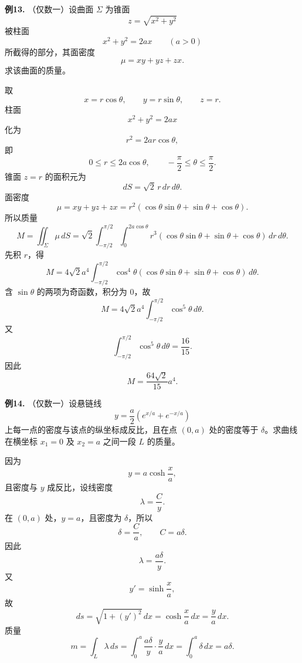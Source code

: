 \begin{problemblock}
\textbf{例13.} （仅数一）设曲面 \(\Sigma\) 为锥面
\[
z=\sqrt{x^2+y^2}
\]
被柱面
\[
x^2+y^2=2ax\qquad (a>0)
\]
所截得的部分，其面密度
\[
\mu=xy+yz+zx.
\]
求该曲面的质量。
\end{problemblock}
\begin{solutionblock}
取
\[
x=r\cos\theta,\qquad y=r\sin\theta,\qquad z=r.
\]
柱面
\[
x^2+y^2=2ax
\]
化为
\[
r^2=2ar\cos\theta,
\]
即
\[
0\le r\le2a\cos\theta,\qquad -\frac{\pi}{2}\le\theta\le\frac{\pi}{2}.
\]
锥面 \(z=r\) 的面积元为
\[
dS=\sqrt2\,r\,dr\,d\theta.
\]
面密度
\[
\mu=xy+yz+zx
=r^2(\cos\theta\sin\theta+\sin\theta+\cos\theta).
\]
所以质量
\[
M=\iint_\Sigma \mu\,dS
=\sqrt2\int_{-\pi/2}^{\pi/2}\int_0^{2a\cos\theta}
r^3(\cos\theta\sin\theta+\sin\theta+\cos\theta)\,dr\,d\theta.
\]
先积 \(r\)，得
\[
M=4\sqrt2a^4\int_{-\pi/2}^{\pi/2}
\cos^4\theta(\cos\theta\sin\theta+\sin\theta+\cos\theta)\,d\theta.
\]
含 \(\sin\theta\) 的两项为奇函数，积分为 \(0\)，故
\[
M=4\sqrt2a^4\int_{-\pi/2}^{\pi/2}\cos^5\theta\,d\theta.
\]
又
\[
\int_{-\pi/2}^{\pi/2}\cos^5\theta\,d\theta=\frac{16}{15}.
\]
因此
\[
M=\frac{64\sqrt2}{15}a^4.
\]
\end{solutionblock}

\begin{problemblock}
\textbf{例14.} （仅数一）设悬链线
\[
y=\frac a2\left(e^{x/a}+e^{-x/a}\right)
\]
上每一点的密度与该点的纵坐标成反比，且在点 \((0,a)\) 处的密度等于 \(\delta\)。求曲线在横坐标 \(x_1=0\) 及 \(x_2=a\) 之间一段 \(L\) 的质量。
\end{problemblock}
\begin{solutionblock}
因为
\[
y=a\cosh\frac{x}{a},
\]
且密度与 \(y\) 成反比，设线密度
\[
\lambda=\frac{C}{y}.
\]
在 \((0,a)\) 处，\(y=a\)，且密度为 \(\delta\)，所以
\[
\delta=\frac Ca,
\qquad C=a\delta.
\]
因此
\[
\lambda=\frac{a\delta}{y}.
\]
又
\[
y'=\sinh\frac{x}{a},
\]
故
\[
ds=\sqrt{1+(y')^2}\,dx
=\cosh\frac{x}{a}\,dx
=\frac{y}{a}\,dx.
\]
质量
\[
m=\int_L\lambda\,ds
=\int_0^a\frac{a\delta}{y}\cdot\frac{y}{a}\,dx
=\int_0^a\delta\,dx
=a\delta.
\]
\end{solutionblock}

